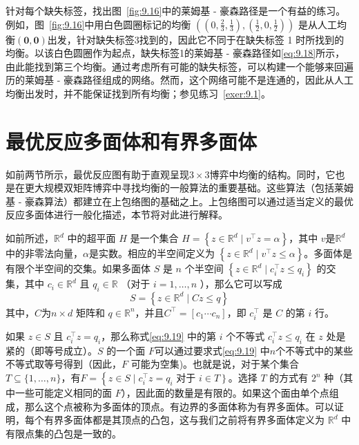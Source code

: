 针对每个缺失标签，找出图~\ref{fig:9.16}中的莱姆基 - 豪森路径是一个有益的练习。例如，图~\ref{fig:9.16}中用白色圆圈标记的均衡 \(\left( {\left( {0,\frac{2}{3},\frac{1}{3}}\right),\left( {\frac{1}{2},0,\frac{1}{2}}\right) }\right)\) 是从人工均衡$(\mathbf{0},\mathbf{0})$出发，针对缺失标签3找到的，因此它不同于在缺失标签 1 时所找到的均衡。以该白色圆圈作为起点，缺失标签1的莱姆基 - 豪森路径如\eqref{eq:9.18}所示，由此能找到第三个均衡。通过考虑所有可能的缺失标签，可以构建一个能够来回遍历的莱姆基 - 豪森路径组成的网络。然而，这个网络可能不是连通的，因此从人工均衡出发时，并不能保证找到所有均衡；参见练习~\ref{exer:9.1}。



\section{最优反应多面体和有界多面体}  \label{sec9.6}



如前两节所示，最优反应图有助于直观呈现\(3 \times  3\)博弈中均衡的结构。同时，它也是在更大规模双矩阵博弈中寻找均衡的一般算法的重要基础。这些算法（包括莱姆基 - 豪森算法）都建立在上包络图的基础之上。上包络图可以通过适当定义的最优反应多面体进行一般化描述，本节将对此进行解释。

如前所述，\({\mathbb{R}}^{d}\) 中的超平面 \(H\) 是一个集合 \(H = \left\{  {z \in  {\mathbb{R}}^{d} \mid  {v}^{\top }z = \alpha }\right\}\)，其中 \(v\)是\({\mathbb{R}}^{d}\) 中的非零法向量，\(\alpha\)是实数。相应的半空间定义为 \(\left\{  {z \in  {\mathbb{R}}^{d} \mid  {v}^{\top }z \leq  \alpha }\right\}\)。多面体是有限个半空间的交集。如果多面体 \(S\) 是 \(n\) 个半空间 \(\left\{  {z \in  {\mathbb{R}}^{d} \mid  {c}_{i}^{\top }z \leq  {q}_{i}}\right\}\) 的交集，其中 \({c}_{i} \in  {\mathbb{R}}^{d}\) 且 \({q}_{i} \in  \mathbb{R}\) （对于 \(i = 1,\ldots,n\) ），那么它可以写成
\begin{equation}  \label{eq:9.19}
S = \left\{  {z \in  {\mathbb{R}}^{d} \mid  {Cz} \leq  q}\right\}
\end{equation}
其中，\(C\)为\(n \times  d\) 矩阵和 \(q \in  {\mathbb{R}}^{n}\)，并且\({C}^{\top } = \left\lbrack  {{c}_{1}\cdots {c}_{n}}\right\rbrack\)，即 \({c}_{i}^{\top }\) 是 \(C\) 的第 \(i\) 行。

如果 \(z \in  S\) 且 \({c}_{i}^{\top }z = {q}_{i}\)，那么称式\eqref{eq:9.19} 中的第 \(i\) 个不等式 \({c}_{i}^{\top }z \leq  {q}_{i}\) 在 \(z\) 处是紧的（即等号成立）。\(S\) 的一个面 \(F\)可以通过要求式\eqref{eq:9.19}  中\(n\)个不等式中的某些不等式取等号得到（因此，\(F\) 可能为空集)。也就是说，对于某个集合 \(T \subseteq  \{ 1,\ldots,n\}\)，有\(F = \left\{  {z \in  S \mid  {c}_{i}^{\top }z = {q}_{i}}\right.\) \mbox{对于} \(\left. {i \in  T}\right\}\)。选择 \(T\) 的方式有 \({2}^{n}\) 种（其中一些可能定义相同的面 \(F\)），因此面的数量是有限的。如果这个面由单个点组成，那么这个点被称为多面体的顶点。有边界的多面体称为有界多面体。可以证明，每个有界多面体都是其顶点的凸包，这与我们之前将有界多面体定义为 \({\mathbb{R}}^{d}\) 中有限点集的凸包是一致的。


